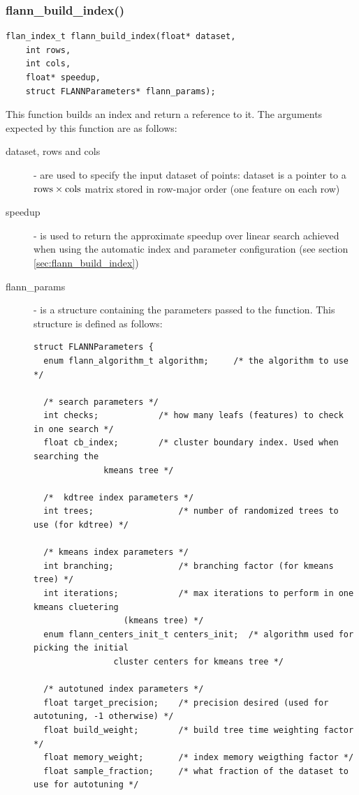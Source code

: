 \documentclass[letter,10pt]{article}
\begin{document}
\subsubsection{flann\_build\_index()}
\begin{Verbatim}[fontsize=\footnotesize,frame=single]
flan_index_t flann_build_index(float* dataset,
	int rows,
	int cols,
	float* speedup,
	struct FLANNParameters* flann_params);
\end{Verbatim}
This function builds an index and return a reference to it. The arguments
expected by this function are as follows:
\begin{description}
 \item[dataset, rows and cols] - are used to specify the input dataset of
points: dataset is a pointer to a $\rm{rows} \times \rm{cols}$ matrix
stored in row-major order (one feature on each row)
\item [speedup] - is used to return the approximate speedup over linear
search achieved when using the automatic index and parameter configuration
(see section \ref{sec:flann_build_index})
\item [flann\_params] - is a structure containing the parameters passed to
the function. This structure is defined as follows:
\begin{Verbatim}[fontsize=\footnotesize]
struct FLANNParameters {
  enum flann_algorithm_t algorithm; 	/* the algorithm to use */

  /* search parameters */
  int checks;            /* how many leafs (features) to check in one search */
  float cb_index;        /* cluster boundary index. Used when searching the 
			  kmeans tree */

  /*  kdtree index parameters */
  int trees;                 /* number of randomized trees to use (for kdtree) */

  /* kmeans index parameters */
  int branching;             /* branching factor (for kmeans tree) */
  int iterations;            /* max iterations to perform in one kmeans cluetering 
			      (kmeans tree) */
  enum flann_centers_init_t centers_init;  /* algorithm used for picking the initial 
				cluster centers for kmeans tree */

  /* autotuned index parameters */
  float target_precision;    /* precision desired (used for autotuning, -1 otherwise) */
  float build_weight;        /* build tree time weighting factor */
  float memory_weight;       /* index memory weigthing factor */
  float sample_fraction;     /* what fraction of the dataset to use for autotuning */


\end{Verbatim}
\end{description}
\end{document}
